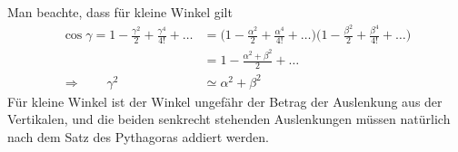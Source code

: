 \begin{diskussion}
Man beachte, dass für kleine Winkel gilt
\begin{align*}
\cos\gamma=
1-\frac{\gamma^2}2+\frac{\gamma^4}{4!}+\dots
&=
\biggl(
1-\frac{\alpha^2}2+\frac{\alpha^4}{4!}+\dots
\biggl)
\biggl(
1-\frac{\beta^2}2+\frac{\beta^4}{4!}+\dots
\biggl)
\\
&=
1-\frac{\alpha^2+\beta^2}2+\dots
\\
\Rightarrow\qquad
\gamma^2&\simeq\alpha^2+\beta^2
\end{align*}
Für kleine Winkel ist der Winkel ungefähr der Betrag der Auslenkung aus der
Vertikalen, und die beiden senkrecht stehenden Auslenkungen müssen natürlich
nach dem Satz des Pythagoras addiert werden.
\end{diskussion}

